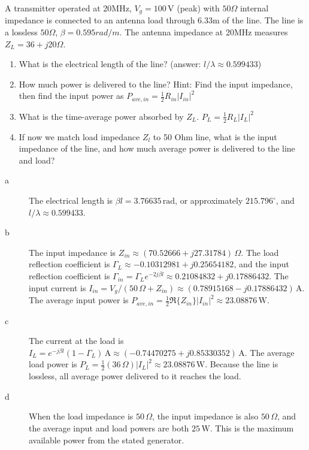 \documentclass{ximera}
\begin{document}
\begin{example}
A transmitter operated at 20MHz, $V_g=100\,\mathrm{V}$ (peak) with $50 \Omega$ internal impedance is connected to an antenna load through 6.33m of the line. The line is a lossless $50 \Omega$, $\beta=0.595rad/m$. The antenna impedance at 20MHz measures $Z_L=36+j20 \Omega$.
\begin{enumerate}
\item What is the electrical length of the line? (answer: $l/\lambda\approx 0.599433$)
\item How much power is delivered to the line? Hint: Find the input impedance, then find the input power as $P_{ave,in}=\frac{1}{2}R_{in} |I_{in}|^2$
\item What is the time-average power absorbed by $Z_L$. $P_{L}=\frac{1}{2} R_L |I_{L}|^2$
\item If now we match load impedance $Z_l$ to 50 Ohm line, what is the input impedance of the line, and how much average power is delivered to the line and load?
\end{enumerate}
\begin{solution}
\begin{description}
\item[a] The electrical length is $\beta l=3.76635\,\mathrm{rad}$, or approximately $215.796^\circ$, and $l/\lambda\approx 0.599433$.
\item[b] The input impedance is $Z_{in}\approx (70.52666+j27.31784)\,\Omega$.
The load reflection coefficient is $\Gamma_L\approx -0.10312981+j0.25654182$, and the input reflection coefficient is $\Gamma_{in}=\Gamma_L e^{-2j\beta l}\approx 0.21084832+j0.17886432$.
The input current is $I_{in}=V_g/(50\,\Omega+Z_{in})\approx (0.78915168-j0.17886432)\,\mathrm{A}$.
The average input power is $P_{ave,in}=\frac{1}{2}\Re\{Z_{in}\}|I_{in}|^2\approx 23.08876\,\mathrm{W}$.
\item[c] The current at the load is $I_L=e^{-j\beta l}(1-\Gamma_L)\,\mathrm{A}\approx (-0.74470275+j0.85330352)\,\mathrm{A}$. The average load power is $P_L=\frac{1}{2}(36\,\Omega)|I_L|^2\approx 23.08876\,\mathrm{W}$. Because the line is lossless, all average power delivered to it reaches the load.
\item[d] When the load impedance is $50\,\Omega$, the input impedance is also $50\,\Omega$, and the average input and load powers are both $25\,\mathrm{W}$. This is the maximum available power from the stated generator.
\end{description}


 
\end{solution}


\end{example}
\end{document}
